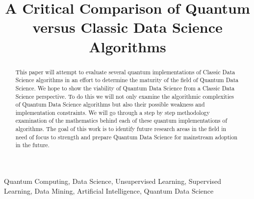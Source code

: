 \documentclass[conference]{IEEEtran}
\begin{document}
\title{A Critical Comparison of Quantum versus Classic Data Science Algorithms\\


}

\author{


}

\maketitle

\begin{abstract}
This paper will attempt to evaluate several quantum implementations of Classic Data Science algorithms in an effort to determine the maturity of the field of Quantum Data Science. We hope to show the viability of Quantum Data Science from a Classic Data Science perspective. To do this we will not only examine the algorithmic complexities of Quantum Data Science algorithms but also their possible weakness and implementation constraints. We will go through a step by step methodology examination of the mathematics behind each of these quantum implementations of algorithms. The goal of this work is to identify future research areas in the field in need of focus to strength and prepare Quantum Data Science for mainstream adoption in the future. 
\end{abstract}

\begin{IEEEkeywords}
Quantum Computing, Data Science, Unsupervised Learning, Supervised Learning, Data Mining, Artificial Intelligence, Quantum Data Science 
\end{IEEEkeywords}
\end{document}
